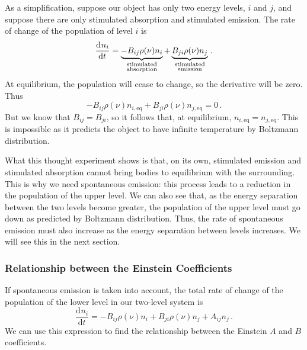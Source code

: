 \documentclass{article}
\theoremstyle{plain}\theoremheaderfont{\normalfont\itshape}\theorembodyfont{\rmfamily}\theoremseparator{.}\newtheorem*{rem}{Remark}\newtheorem*{ex}{Example}\newtheorem*{proof}{Proof}\newtheorem*{altp}{Alternative proof}
\theoremstyle{plain}\theoremheaderfont{\normalfont\bfseries}\theorembodyfont{\rmfamily}\theoremseparator{.}\newtheorem{thm}{Theorem}[section]\newtheorem{lem}[thm]{Lemma}\newtheorem{prop}[thm]{Proposition}\newtheorem*{cor}{Corollary}\newtheorem{defn}[thm]{Definition}\newtheorem{clm}[thm]{Claim}\newtheorem{clminproof}{Claim}\newtheorem{pos}{Postulate}[section]
\theoremstyle{break}\theoremheaderfont{\normalfont\itshape}\theorembodyfont{\rmfamily}\theoremseparator{.\medskip}\newtheorem*{proofskip}{Proof}\newtheorem*{exs}{Examples}\newtheorem*{rems}{Remarks}
\theoremstyle{break}\theoremheaderfont{\normalfont\bfseries}\theorembodyfont{\rmfamily}\theoremseparator{.\medskip}\newtheorem{lemskip}[thm]{Lemma}\newtheorem{defnskip}[thm]{Definition}\newtheorem{propskip}[thm]{Proposition}\newtheorem{thmskip}[thm]{Theorem}
\numberwithin{equation}{section}
\newcommand{\dv}[3][]{\frac{\mathrm{d}^{#1} #2}{{\mathrm{d} #3}^{#1}}}
\begin{document}
    As a simplification, suppose our object has only two energy levels, \(i\) and \(j\), and suppose there are only stimulated absorption and stimulated emission. The rate of change of the population of level \(i\) is
    \begin{equation}
        \dv{n_i}{t}=\underbrace{-B_{ij}\rho(\nu)n_i}_{\begin{subarray}{c}\text{stimulated} \\ \text{absorption} \end{subarray}}+\underbrace{B_{ji}\rho(\nu)n_j}_{\begin{subarray}{c}\text{stimulated} \\ \text{emission} \end{subarray}}\,.
    \end{equation}
    At equilibrium, the population will cease to change, so the derivative will be zero. Thus
    \begin{equation}
        -B_{ij}\rho(\nu)n_{i,\text{eq}}+B_{ji}\rho(\nu)n_{j,\text{eq}}=0\,.
    \end{equation}
    But we know that \(B_{ij}=B_{ji}\), so it follows that, at equilibrium, \(n_{i,\text{eq}}=n_{j,\text{eq}}\). This is impossible as it predicts the object to have infinite temperature by Boltzmann distribution.

    What this thought experiment shows is that, on its own, stimulated emission and stimulated absorption cannot bring bodies to equilibrium with the surrounding. This is why we need spontaneous emission: this process leads to a reduction in the population of the upper level. We can also see that, as the energy separation between the two levels become greater, the population of the upper level must go down as predicted by Boltzmann distribution. Thus, the rate of spontaneous emission must also increase as the energy separation between levels increases. We will see this in the next section.
    \subsubsection{Relationship between the Einstein Coefficients}
    If spontaneous emission is taken into account, the total rate of change of the population of the lower level in our two-level system is
    \begin{equation}\label{population_derivative}
        \dv{n_i}{t}=-B_{ij}\rho(\nu)n_i+B_{ji}\rho(\nu)n_j+A_{ij}n_j\,.
    \end{equation}
    We can use this expression to find the relationship between the Einstein \(A\) and \(B\) coefficients.
\end{document}
